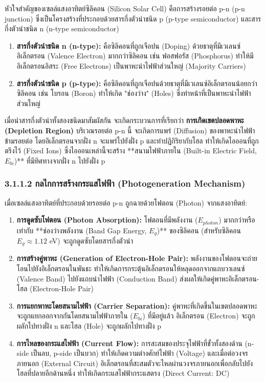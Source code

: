 \documentclass[11pt,a4paper,openany]{report}
\begin{document}
หัวใจสำคัญของเซลล์แสงอาทิตย์ซิลิคอน (Silicon Solar Cell) คือการสร้างรอยต่อ p-n (p-n junction) ซึ่งเป็นโครงสร้างที่ประกอบด้วยสารกึ่งตัวนำชนิด p (p-type semiconductor) และสารกึ่งตัวนำชนิด n (n-type semiconductor)

\begin{enumerate}
  \item \textbf{สารกึ่งตัวนำชนิด n (n-type):} คือซิลิคอนที่ถูกเจือปน (Doping) ด้วยธาตุที่มีเวเลนซ์อิเล็กตรอน (Valence Electron) มากกว่าซิลิคอน เช่น ฟอสฟอรัส (Phosphorus) ทำให้มีอิเล็กตรอนอิสระ (Free Electrons) เป็นพาหะนำไฟฟ้าส่วนใหญ่ (Majority Carriers)
  \item \textbf{สารกึ่งตัวนำชนิด p (p-type):} คือซิลิคอนที่ถูกเจือปนด้วยธาตุที่มีเวเลนซ์อิเล็กตรอนน้อยกว่าซิลิคอน เช่น โบรอน (Boron) ทำให้เกิด "ช่องว่าง" (Holes) ซึ่งทำหน้าที่เป็นพาหะนำไฟฟ้าส่วนใหญ่
\end{enumerate}


เมื่อนำสารกึ่งตัวนำทั้งสองชนิดมาสัมผัสกัน จะเกิดกระบวนการที่เรียกว่า \textbf{การเกิดเขตปลอดพาหะ (Depletion Region)} บริเวณรอยต่อ p-n นี้ จะเกิดการแพร่ (Diffusion) ของพาหะนำไฟฟ้าข้ามรอยต่อ โดยอิเล็กตรอนจากฝั่ง n จะแพร่ไปยังฝั่ง p และทำปฏิกิริยากับโฮล ทำให้เกิดไอออนที่ถูกตรึงไว้ (Fixed Ions) ซึ่งไอออนเหล่านี้จะสร้าง **สนามไฟฟ้าภายใน (Built-in Electric Field, $E_{bi}$)** ที่มีทิศทางจากฝั่ง n ไปยังฝั่ง p

\subsubsection{3.1.1.2 กลไกการสร้างกระแสไฟฟ้า (Photogeneration Mechanism)}


เมื่อเซลล์แสงอาทิตย์ที่ประกอบด้วยรอยต่อ p-n ถูกฉายด้วยโฟตอน (Photon) จากแสงอาทิตย์:

\begin{enumerate}
  \item \textbf{การดูดซับโฟตอน (Photon Absorption):} โฟตอนที่มีพลังงาน ($E_{photon}$) มากกว่าหรือเท่ากับ **ช่องว่างพลังงาน (Band Gap Energy, $E_g$)** ของซิลิคอน (สำหรับซิลิคอน $E_g \approx 1.12$ eV) จะถูกดูดซับโดยสารกึ่งตัวนำ
  \item \textbf{การสร้างคู่พาหะ (Generation of Electron-Hole Pair):} พลังงานของโฟตอนจะถ่ายโอนไปยังอิเล็กตรอนในพันธะ ทำให้เกิดการกระตุ้นอิเล็กตรอนให้หลุดออกจากแถบวาเลนซ์ (Valence Band) ไปยังแถบนำไฟฟ้า (Conduction Band) ส่งผลให้เกิดคู่พาหะอิเล็กตรอน-โฮล (Electron-Hole Pair)
  \item \textbf{การแยกพาหะโดยสนามไฟฟ้า (Carrier Separation):} คู่พาหะที่เกิดขึ้นในเขตปลอดพาหะจะถูกแยกออกจากกันโดยสนามไฟฟ้าภายใน ($E_{bi}$) ที่มีอยู่แล้ว อิเล็กตรอน (Electron) จะถูกผลักไปทางฝั่ง n และโฮล (Hole) จะถูกผลักไปทางฝั่ง p
  \item \textbf{การไหลของกระแสไฟฟ้า (Current Flow):} การสะสมของประจุไฟฟ้าที่ขั้วทั้งสองด้าน (n-side เป็นลบ, p-side เป็นบวก) ทำให้เกิดความต่างศักย์ไฟฟ้า (Voltage) และเมื่อต่อวงจรภายนอก (External Circuit) อิเล็กตรอนที่สะสมตัวจะไหลผ่านวงจรภายนอกเพื่อกลับไปยังโฮลที่ปลายอีกด้านหนึ่ง ทำให้เกิดกระแสไฟฟ้ากระแสตรง (Direct Current: DC)
\end{enumerate}
\end{document}
